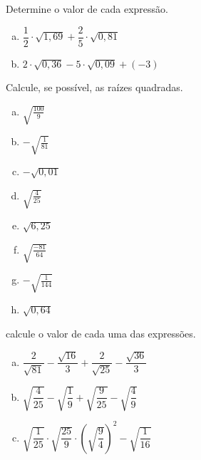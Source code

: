 \item Determine o valor de cada expressão.
\begin{multicols}{2}
\begin{enumerate}[a)]
	\item $\dfrac{1}{2}\cdot \sqrt{1,69} + \dfrac{2}{5}\cdot \sqrt{0,81}$
	\item $2\cdot \sqrt{0,36} - 5\cdot \sqrt{0,09} + (-3)$
\end{enumerate}
\end{multicols}

\item Calcule, se possível, as raízes quadradas.
\begin{multicols}{4}
\begin{enumerate}[a)]
	\item $\sqrt{\displaystyle\frac{100}{9}}$
	\item $-\sqrt{\displaystyle\frac{1}{81}}$
	\item $-\sqrt{0,01}$
	\item $\sqrt{\displaystyle\frac{4}{25}}$
	\item $\sqrt{6,25}$
	\item $\sqrt{\displaystyle\frac{-81}{64}}$
	\item $-\sqrt{\displaystyle\frac{1}{144}}$
	\item $\sqrt{0,64}$
\end{enumerate}
\end{multicols}

\item calcule o valor de cada uma das expressões.
\begin{multicols}{2}
\begin{enumerate}[a)]
	\item $\dfrac{2}{\sqrt{81}}-\dfrac{\sqrt{16}}{3}+\dfrac{2}{\sqrt{25}}-\dfrac{\sqrt{36}}{3}$
	\item $ \sqrt{\dfrac{4}{25}}-\sqrt{\dfrac{1}{9}}+\sqrt{\dfrac{9}{25}}-\sqrt{\dfrac{4}{9}}$
	\item $\sqrt{\dfrac{1}{25}}\cdot\sqrt{\dfrac{25}{9}}\cdot\left(\sqrt{\dfrac{9}{4}}\right)^2 - \sqrt{\dfrac{1}{16}}$	
\end{enumerate}
\end{multicols}


